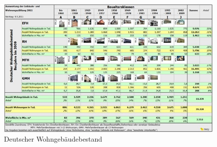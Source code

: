 \begin{figure}[h!]
    \centering
    \includegraphics[width=14cm]{Abbildungen/VerbraucherAbb2.jpg}
    \caption{Deutscher Wohngebäudebestand\cite{baualtersklassen}}\label{fig:Deutscher_Wohngebäudebestand}
\end{figure}

